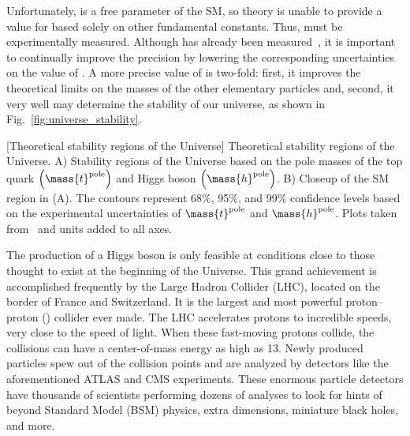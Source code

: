 Unfortunately, \mH is a free parameter of the SM, so theory is unable to provide a value for \mH based solely on other fundamental constants. %
Thus, \mH must be experimentally measured.
Although \mH has already been measured~\cite{chatrchyan_observation_2012, ATLAS:2012yve, chatrchyan_observation_2013, PhysRevLett.114.191803, the_cms_collaboration_precise_2015, HIG_16_041, aaboud_measurement_2018, CMS-PAS-HIG-18-029, sirunyan_measurement_2020}, it is important to continually improve the precision by lowering the corresponding uncertainties on the value of \mh.
A more precise value of \mH is two-fold:
first, it improves the theoretical limits on the masses of the other elementary particles and, second, it very well may determine the stability of our universe, as shown in Fig.~\ref{fig:universe_stability}.

\begin{multiFigure}
    \centering
        [Theoretical stability regions of the Universe]
        {Theoretical stability regions of the Universe.
        \;A) Stability regions of the Universe based on the pole masses of the top quark $\left( \mass{t}^\text{pole} \right)$ and Higgs boson $\left( \mass{h}^\text{pole} \right)$.
        \;B) Closeup of the SM region in (A).
        The contours represent 68\%, 95\%, and 99\% confidence levels based on the experimental uncertainties of $\mass{t}^\text{pole}$ and $\mass{h}^\text{pole}$.
        Plots taken from~\cite{univ_stab} and units added to all axes.}
    \label{fig:universe_stability}
\end{multiFigure}

The production of a Higgs boson is only feasible at conditions close to those thought to exist at the beginning of the Universe.
This grand achievement is accomplished frequently by the Large Hadron Collider (LHC), located on the border of France and Switzerland.
It is the largest and most powerful proton--proton (\pp) collider ever made.
The LHC accelerates protons to incredible speeds, very close to the speed of light.
When these fast-moving protons collide, the \pp collisions can have a center-of-mass energy as high as 13\TeV.
Newly produced particles spew out of the collision points and are analyzed by detectors like the aforementioned ATLAS and CMS experiments.
These enormous particle detectors have thousands of scientists performing dozens of analyses to look for hints of beyond Standard Model (BSM) physics, extra dimensions, miniature black holes, and more.

